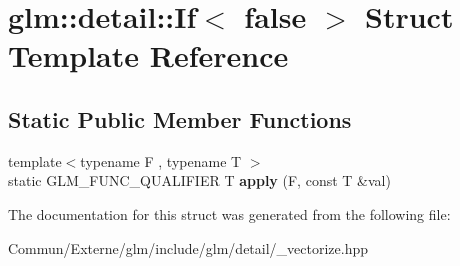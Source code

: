 \hypertarget{structglm_1_1detail_1_1_if_3_01false_01_4}{}\section{glm\+:\+:detail\+:\+:If$<$ false $>$ Struct Template Reference}
\label{structglm_1_1detail_1_1_if_3_01false_01_4}
\subsection*{Static Public Member Functions}
\begin{DoxyCompactItemize}
\item 
{\footnotesize template$<$typename F , typename T $>$ }\\static G\+L\+M\+\_\+\+F\+U\+N\+C\+\_\+\+Q\+U\+A\+L\+I\+F\+I\+ER T {\bfseries apply} (F, const T \&val)\hypertarget{structglm_1_1detail_1_1_if_3_01false_01_4_a31a9409e47dc11cb7d4251c12342b9f6}{}\label{structglm_1_1detail_1_1_if_3_01false_01_4_a31a9409e47dc11cb7d4251c12342b9f6}

\end{DoxyCompactItemize}


The documentation for this struct was generated from the following file\+:\begin{DoxyCompactItemize}
\item 
Commun/\+Externe/glm/include/glm/detail/\+\_\+vectorize.\+hpp\end{DoxyCompactItemize}
